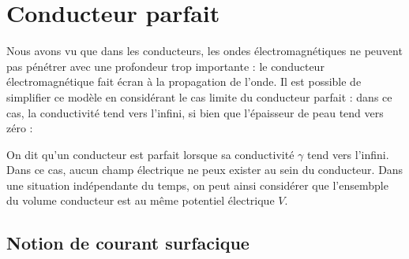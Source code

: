 \documentclass[11pt,fleqn]{book} %
\begin{document}

\section{Conducteur parfait}

Nous avons vu que dans les conducteurs, les ondes électromagnétiques ne peuvent pas pénétrer avec une profondeur trop importante : le conducteur électromagnétique fait écran à la propagation de l'onde. Il est possible de simplifier ce modèle en considérant le cas limite du conducteur parfait : dans ce cas, la conductivité tend vers l'infini, si bien que l'épaisseur de peau tend vers zéro :
\begin{definition}
	On dit qu'un conducteur est parfait lorsque sa conductivité $\gamma$ tend vers l'infini. Dans ce cas, aucun champ électrique ne peux exister au sein du conducteur. Dans une situation indépendante du temps, on peut ainsi considérer que l'ensembple du volume conducteur est au même potentiel électrique $V$.
\end{definition}

\subsection{Notion de courant surfacique}
\end{document}
